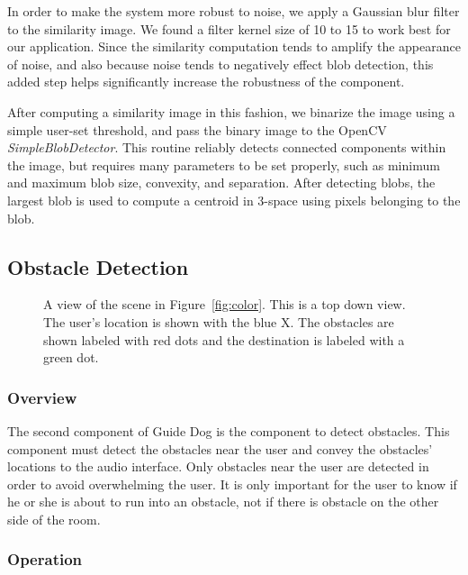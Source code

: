 In order to make the system more robust to noise, we apply a Gaussian blur
filter to the similarity image. We found a filter kernel size of 10 to 15 to work 
best for our application. Since the similarity computation tends
to amplify the appearance of noise, and also because noise tends to
negatively effect blob detection, this added step helps significantly increase
the robustness of the component.

After computing a similarity image in this fashion, we binarize the image
using a simple user-set threshold, and pass the binary image to the OpenCV~\cite{opencv-website}
\emph{SimpleBlobDetector}. This routine reliably detects connected components
within the image, but requires many parameters to be set properly, such as
minimum and maximum  blob size, convexity, and separation. After detecting blobs, the 
largest blob is used to compute a centroid in 3-space using pixels belonging 
to the blob.

\subsection{Obstacle Detection}
\label{sec:technical-obs}

\begin{figure}
\caption{A view of the scene in Figure~\ref{fig:color}. This is a top down view.
  The user's location is shown with the blue X. The obstacles are shown labeled
  with red dots and the destination is labeled with a green dot.}
\label{fig:obstacle}
\end{figure}

\subsubsection{Overview}
\label{sec:technical-obs-overview}

The second component of Guide Dog is the component to detect obstacles. This
component must detect the obstacles near the user and convey the obstacles'
locations to the audio interface. Only obstacles near the user are detected in
order to avoid overwhelming the user. It is only important for the user to
know if he or she is about to run into an obstacle, not if there is obstacle on the
other side of the room.

\subsubsection{Operation}
\label{sec:technical-obs-op}

